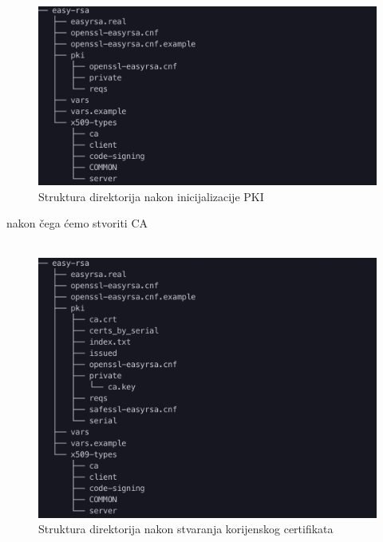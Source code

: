          \\
        
        \begin{figure}[H]
            \centering
            \includegraphics[scale=0.5]{slike/afterPkiInit}
            \caption{Struktura direktorija nakon inicijalizacije PKI}
        \end{figure}
        
        \noindent
        nakon čega ćemo stvoriti CA  \\

        \noindent
         \\
        
        \begin{figure}[H]
            \centering
            \includegraphics[scale=0.5]{slike/afterBuildCa}
            \caption{Struktura direktorija nakon stvaranja korijenskog
            certifikata}
        \end{figure}

